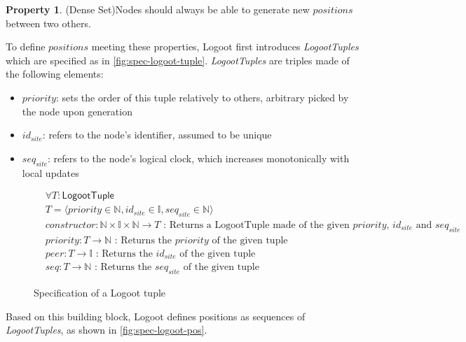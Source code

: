 \documentclass{article}
\newcommand{\fnspec}[3]{#1: #2 \text{ : #3}}
\newcommand{\inbb}[1]{\in \mathbb{#1}}
\newcommand{\tuple}[1]{\langle #1 \rangle}
\theoremstyle{definition}
\theoremstyle{definition}
\newcounter{property-counter}
\theoremstyle{definition}
\newtheorem{property}[property-counter]{Property}
\begin{document}
\begin{property}(Dense Set)\label{prop:dense-set}
    Nodes should always be able to generate new $positions$ between two others.
\end{property}

To define $positions$ meeting these properties, Logoot first introduces \emph{LogootTuples} which are specified as in \autoref{fig:spec-logoot-tuple}.
\emph{LogootTuples} are triples made of the following elements:
\begin{itemize}
    \item $priority$: sets the order of this tuple relatively to others, arbitrary picked by the node upon generation
    \item $id_{site}$: refers to the node's identifier, assumed to be unique
    \item $seq_{site}$: refers to the node's logical clock, which increases monotonically with local updates
\end{itemize}

\begin{figure}[h]
    \begin{align*}
    &\forall T: \mathsf{LogootTuple}\\
    &T = \tuple{priority \inbb{N}, id_{site} \inbb{I}, seq_{site} \inbb{N}}\\
    &\fnspec{constructor}{\mathbb{N} \times \mathbb{I} \times \mathbb{N} \to T}{Returns a LogootTuple made of the given $priority$, $id_{site}$ and $seq_{site}$}\\
    &\fnspec{priority}{T \to \mathbb{N}}{Returns the $priority$ of the given tuple}\\
    &\fnspec{peer}{T \to \mathbb{I}}{Returns the $id_{site}$ of the given tuple}\\
    &\fnspec{seq}{T \to \mathbb{N}}{Returns the $seq_{site}$ of the given tuple}
    \end{align*}
    \caption{Specification of a Logoot tuple}
    \label{fig:spec-logoot-tuple}
\end{figure}

Based on this building block, Logoot defines positions as sequences of \emph{LogootTuples}, as shown in \autoref{fig:spec-logoot-pos}.
\end{document}
